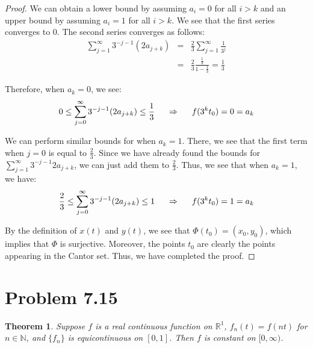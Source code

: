 \documentclass[psamsfonts]{amsart}
\newtheorem{thm}{Theorem}[section]
\theoremstyle{definition}
\theoremstyle{remark}
\numberwithin{equation}{section}
\begin{document}
\begin{proof}
We can obtain a lower bound by assuming $a_i = 0$ for all $i > k$ and an upper bound by assuming $a_i = 1$ for all $i > k$. We see that the first series converges to $0$. The second series converges as follows:
\begin{eqnarray}
\sum_{j=1}^\infty 3^{-j-1} (2 a_{j+k}) &=& \frac{2}{3} \sum_{j=1}^\infty \frac{1}{3^j} \\
&=& \frac{2}{3} \frac{ \frac{1}{3}}{1 - \frac{1}{3}} = \frac{1}{3}
\end{eqnarray}

Therefore, when $a_k = 0$, we see:
\begin{eqnarray}
0 \leq \sum_{j=0}^\infty 3^{-j-1} (2 a_{j+k}) \leq \frac{1}{3} \hspace{0.5cm} \Rightarrow \hspace{0.5cm} f(3^k t_0) = 0 = a_k
\end{eqnarray}

We can perform similar bounds for when $a_k = 1$. There, we see that the first term when $j=0$ is equal to $\frac{2}{3}$. Since we have already found the bounds for $\sum_{j=1}^\infty 3^{-j-1} 2 a_{j+k}$, we can just add them to $\frac{2}{3}$. Thus, we see that when $a_k = 1$, we have:
\begin{eqnarray}
\frac{2}{3} \leq \sum_{j=0}^\infty 3^{-j-1} (2 a_{j+k}) \leq 1 \hspace{0.5cm} \Rightarrow \hspace{0.5cm} f(3^k t_0) = 1 = a_k
\end{eqnarray}

By the definition of $x(t)$ and $y(t)$, we see that $\Phi(t_0) = (x_0, y_0)$, which implies that $\Phi$ is surjective. Moreover, the points $t_0$ are clearly the points appearing in the Cantor set. Thus, we have completed the proof.
\end{proof}


\section{Problem 7.15}

\begin{thm}
Suppose $f$ is a real continuous function on $\mathbb{R}^1$, $f_n(t) = f(nt)$ for $n \in \mathbb{N}$, and $\{ f_n \}$ is equicontinuous on $[0,1]$. Then $f$ is constant on $[0,\infty)$. 
\end{thm}
\end{document}
